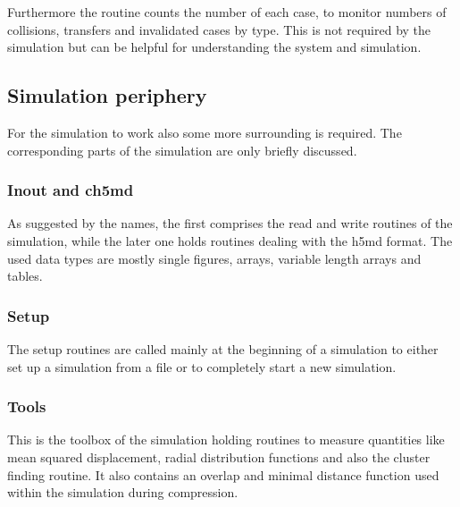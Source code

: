 Furthermore the routine counts the number of each case, to monitor numbers of collisions, transfers and invalidated cases by type. This is not required by the simulation but can be helpful for understanding the system and simulation.\\

\subsection{Simulation periphery}
For the simulation to work also some more surrounding is required. The corresponding parts of the simulation are only briefly discussed.
 
\subsubsection{Inout and ch5md}
As suggested by the names, the first comprises the read and write routines of the simulation, while the later one holds routines dealing with the h5md format. The used data types are mostly single figures, arrays, variable length arrays and tables.

\subsubsection{Setup}
The setup routines are called mainly at the beginning of a simulation to either set up a simulation from a file or to completely start a new simulation.

\subsubsection{Tools}
This is the toolbox of the simulation holding routines to measure quantities like mean squared displacement, radial distribution functions and also the cluster finding routine. It also contains an overlap and minimal distance function used within the simulation during compression.



